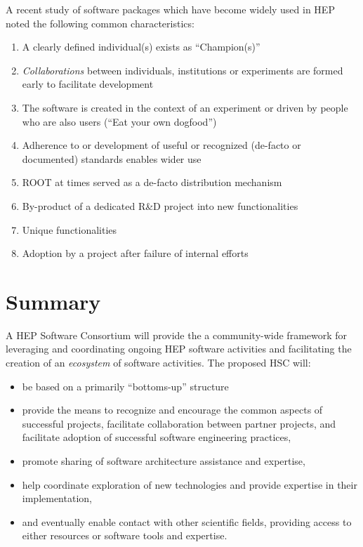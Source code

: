\documentclass[12pt,letterpaper,fleqn]{article}
\begin{document}
A recent study of software packages which have become widely used
in HEP noted the following common characteristics:
\begin{enumerate}
\item A clearly defined individual(s) exists as ``Champion(s)''
\item {\em Collaborations} between individuals, institutions or experiments are formed early to facilitate development
\item The software is created in the context of an experiment or driven by people who are also users (``Eat your own dogfood'')
\item Adherence to or development of useful or recognized (de-facto or documented) standards enables wider use
\item ROOT at times served as a de-facto distribution mechanism
\item By-product of a dedicated R\&D project into new functionalities
\item Unique functionalities
\item Adoption by a project after failure of internal efforts
\end{enumerate}


\section{Summary} 


A HEP Software Consortium will provide the a community-wide framework
for leveraging and coordinating ongoing HEP software activities and facilitating the creation of an {\it ecosystem} of software activities.   The proposed HSC will:
\begin{itemize}
\item be based on a primarily ``bottoms-up'' structure
\item provide the means to recognize and encourage the common aspects
of successful projects, facilitate collaboration between partner
projects, and facilitate adoption of successful software engineering
practices,
\item promote sharing of software architecture assistance and expertise,
\item help coordinate exploration of new technologies and provide expertise in their implementation,
\item and eventually enable contact with other scientific fields,
providing access to either resources or software tools and expertise.
\end{itemize}



\newpage

%
%
\end{document}

